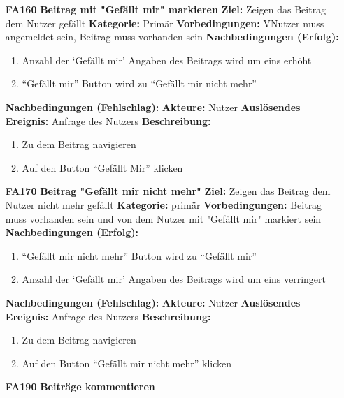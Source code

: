 \documentclass[parskip=full]{scrartcl}
\begin{document}
\begin{itemize}[nosep]
		\item[\textbf{FA160}]\textbf{Beitrag mit "Gefällt mir" markieren}
		\newline \textbf{Ziel:} Zeigen das Beitrag dem Nutzer gefällt
		\newline \textbf{Kategorie:} Primär
		\newline \textbf{Vorbedingungen:} VNutzer muss angemeldet sein, Beitrag muss vorhanden sein
		\newline \textbf{Nachbedingungen (Erfolg):}
		\begin{enumerate}[nosep]
			\item Anzahl der ‘Gefällt mir’ Angaben des Beitrags wird um eins erhöht
			\item “Gefällt mir” Button wird zu “Gefällt mir nicht mehr”
		\end{enumerate}
		\textbf{Nachbedingungen (Fehlschlag):}
		\newline \textbf{Akteure:} Nutzer
		\newline \textbf{Auslösendes Ereignis:} Anfrage des Nutzers
		\newline \textbf{Beschreibung:}
		\begin{enumerate}[nosep]
			\item Zu dem Beitrag navigieren
			\item Auf den Button “Gefällt Mir” klicken\\
		\end{enumerate}


		\item[\textbf{FA170}]\textbf{Beitrag "Gefällt mir nicht mehr"}
		\newline \textbf{Ziel:} Zeigen das Beitrag dem Nutzer nicht mehr gefällt
		\newline \textbf{Kategorie:} primär
		\newline \textbf{Vorbedingungen:} Beitrag muss vorhanden sein und von dem Nutzer mit "Gefällt mir" markiert sein
		\newline \textbf{Nachbedingungen (Erfolg):}
		\begin{enumerate}[nosep]
			\item “Gefällt mir nicht mehr” Button wird zu “Gefällt mir”
			\item Anzahl der ‘Gefällt mir’ Angaben des Beitrags wird um eins  verringert
		\end{enumerate}
		\textbf{Nachbedingungen (Fehlschlag):}
		\newline \textbf{Akteure:} Nutzer
		\newline \textbf{Auslösendes Ereignis:} Anfrage des Nutzers
		\newline \textbf{Beschreibung:}
		\begin{enumerate}[nosep]
			\item Zu dem Beitrag navigieren
			\item Auf den Button “Gefällt mir nicht mehr” klicken\\
		\end{enumerate}


		\item[\textbf{FA190}]\textbf{Beiträge kommentieren}

	\end{itemize}
\end{document}
